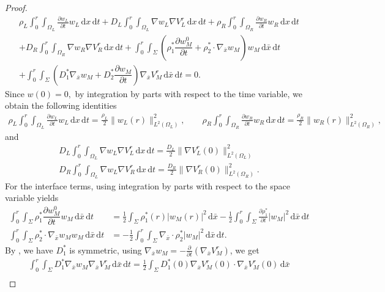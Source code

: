 \documentclass[11pt]{article}
\def\mor{\Omega_R}
\def\mol{\Omega_L}
\def\p{\partial}
\newcommand{\di}[1]{\,\mathrm{d}#1}
\begin{document}
\begin{proof}
\begin{multline}\label{eq:testing_with_Vr}
      \rho_L\int_0^r\int_{\mol}\frac{\p w_L}{\p t}w_L\di{x}\di{t}+D_L\int_0^r\int_{\mol}\nabla w_L\nabla V^r_L\di{x}\di{t}+\rho_R\int_0^r\int_{\mor}\frac{\p w_R}{\p t}w_R\di{x}\di{t}\\
        +D_R\int_0^r\int_{\mor}\nabla w_R\nabla V^r_R\di{x}\di{t}
        +\int_0^r\int_\Sigma \left(\rho_{1}^*\dfrac{\partial w_M^0}{\partial t}+\rho_{2}^*\cdot \nabla_{\bar x}w_M\right)w_M\di{\bar x}\di{t}
        \\
        +\int_0^r\int_{\Sigma}\left(D_1^* \nabla_{\bar x}w_M+D_2^*\dfrac{\partial w_M}{\partial t}\right)\nabla_{\bar x}V^r_M\di{\bar x}\di{t}=0.
\end{multline}
Since $w(0)=0,$ by integration by parts with respect to the time variable, we obtain the following identities
\begin{align*}
    \rho_L\int_0^r\int_{\mol}\frac{\p w_L}{\p t}w_L\di{x}\di{t}=\frac{\rho_L}{2}\|w_L(r)\|_{L^2(\mol)}^2, \qquad \rho_R\int_0^r\int_{\mor}\frac{\p w_R}{\p t}w_R\di{x}\di{t}=\frac{\rho_R}{2}\|w_R(r)\|_{L^2(\mor)}^2,
    \end{align*}
    and
    \begin{align*}
    D_L\int_0^r\int_{\mol}\nabla w_L\nabla V^r_L\di{x}\di{t}=\frac{D_L}{2}\|\nabla V^r_L(0)\|_{L^2(\mol)}^2 \\
    D_R\int_0^r\int_{\mol}\nabla w_L\nabla V^r_R\di{x}\di{t}=\frac{D_R}{2}\|\nabla V^r_R(0)\|_{L^2(\mor)}^2.
\end{align*}
For the interface terms, using integration by parts with respect to the space variable yields
\begin{align*}
    \int_0^r\int_\Sigma \rho_{1}^*\dfrac{\partial w_M^0}{\partial t} w_M\di{\bar x}\di{t}&=\frac{1}{2}\int_\Sigma \rho_{1}^*(r)|w_M(r)|^2\di{\bar x}-\frac12 \int_0^r\int_\Sigma \frac{\p \rho_{1}^*}{\p t} |w_M|^2\di{\bar x}\di{t}\\
    \int_0^r\int_\Sigma \rho_{2}^*\cdot \nabla_{\bar x}w_M w_M\di{\bar x}\di{t}&=-\frac{1}{2}\int_0^r \int_{\Sigma} \nabla_{\bar x}\cdot \rho_{2}^*|w_M|^2\di{\bar x}\di{t}.
\end{align*}
By , we have $D_1^*$ is symmetric,  using $\nabla_{\bar x} w_M=-\frac{\p }{\p t}(\nabla_{\bar x}V_M^r)$, we get 
\begin{multline*}
    \int_0^r\int_{\Sigma}D_1^* \nabla_{\bar x}w_M\nabla_{\bar x}V^r_M\di{\bar x}\di{t}=\frac{1}{2}\int_\Sigma D_1^*(0)\nabla_{\bar x}V_M^r(0)\cdot \nabla_{\bar x}V_M^r(0)\di{\bar x}\\

\end{multline*}
\end{proof}
\end{document}
